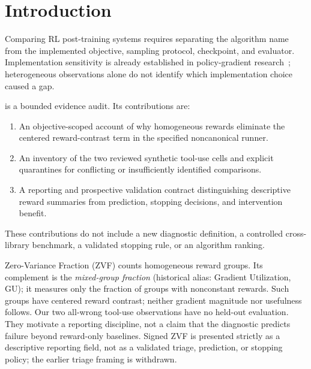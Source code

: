 \section{Introduction}
\label{sec:intro}
Comparing RL post-training systems requires separating the algorithm name from
the implemented objective, sampling protocol, checkpoint, and evaluator.
Implementation sensitivity is already established in policy-gradient
research~\citep{engstrom2020implementation,henderson2018deep}; heterogeneous
observations alone do not identify which implementation choice caused a gap.

\ours{} is a bounded evidence audit. Its contributions are:
\begin{enumerate}
\item An objective-scoped account of why homogeneous rewards eliminate the
centered reward-contrast term in the specified noncanonical runner.
\item An inventory of the two reviewed synthetic tool-use cells and explicit
quarantines for conflicting or insufficiently identified comparisons.
\item A reporting and prospective validation contract distinguishing descriptive
reward summaries from prediction, stopping decisions, and intervention benefit.
\end{enumerate}
These contributions do not include a new diagnostic definition, a controlled
cross-library benchmark, a validated stopping rule, or an algorithm ranking.

Zero-Variance Fraction (ZVF) counts homogeneous reward groups. Its complement is
the \emph{mixed-group fraction} (historical alias: Gradient Utilization, GU); it
measures only the fraction of groups with nonconstant rewards. Such groups have centered
reward contrast; neither gradient magnitude nor usefulness follows. Our two
all-wrong tool-use observations have no held-out evaluation. They motivate a
reporting discipline, not a claim that the diagnostic predicts failure beyond
reward-only baselines. Signed ZVF is presented strictly as a descriptive reporting
field, not as a validated triage, prediction, or stopping policy; the earlier
triage framing is withdrawn.

